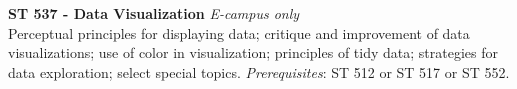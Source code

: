 \documentclass[10pt]{article}
\begin{document}
\vspace{1pc}
\noindent
\textbf{ST 537 - Data Visualization} \emph{E-campus only}\\
Perceptual principles for displaying data; critique and improvement of data visualizations; use of color in 
visualization; principles of tidy data; strategies for data exploration; select special topics. 
\emph{Prerequisites}: ST 512 or ST 517 or ST 552.
\end{document}
